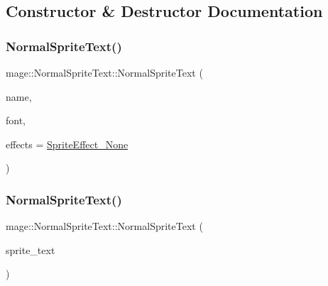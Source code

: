 \subsection{Constructor \& Destructor Documentation}
\hypertarget{classmage_1_1_normal_sprite_text_af91e5d22a02044c4159eefdc161c5dec}{}\label{classmage_1_1_normal_sprite_text_af91e5d22a02044c4159eefdc161c5dec} 
\subsubsection{\texorpdfstring{Normal\+Sprite\+Text()}{NormalSpriteText()}\hspace{0.1cm}{\footnotesize\ttfamily [1/3]}}
{\footnotesize\ttfamily mage\+::\+Normal\+Sprite\+Text\+::\+Normal\+Sprite\+Text (\begin{DoxyParamCaption}\item[{const string \&}]{name,  }\item[{\hyperlink{namespacemage_a1e01ae66713838a7a67d30e44c67703e}{Shared\+Ptr}$<$ \hyperlink{classmage_1_1_sprite_font}{Sprite\+Font} $>$}]{font,  }\item[{\hyperlink{namespacemage_a9cfe18123066ba4236f548f9de75d881}{Sprite\+Effect}}]{effects = {\ttfamily \hyperlink{namespacemage_a9cfe18123066ba4236f548f9de75d881af3c275fbfacfe174da928b2f24dfa515}{Sprite\+Effect\+\_\+\+None}} }\end{DoxyParamCaption})\hspace{0.3cm}{\ttfamily [explicit]}}

\hypertarget{classmage_1_1_normal_sprite_text_a3bd8f94a53caeb7ead9312da6b9b849a}{}\label{classmage_1_1_normal_sprite_text_a3bd8f94a53caeb7ead9312da6b9b849a} 
\subsubsection{\texorpdfstring{Normal\+Sprite\+Text()}{NormalSpriteText()}\hspace{0.1cm}{\footnotesize\ttfamily [2/3]}}
{\footnotesize\ttfamily mage\+::\+Normal\+Sprite\+Text\+::\+Normal\+Sprite\+Text (\begin{DoxyParamCaption}\item[{const \hyperlink{classmage_1_1_normal_sprite_text}{Normal\+Sprite\+Text} \&}]{sprite\+\_\+text }\end{DoxyParamCaption})\hspace{0.3cm}{\ttfamily [default]}}

